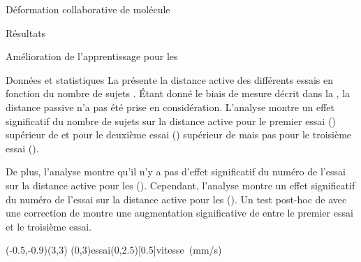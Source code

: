 \documentclass[myfrancais,ngerman,english,french]{mythesis}
\begin{document}
\begin{mychapter}{Déformation collaborative de molécule}
\begin{mysection}{Résultats}
\begin{mysubsection}{Amélioration de l'apprentissage pour les }
\begin{mysubsubsection}{Données et statistiques}
					La  présente la distance active  des différents essais  en fonction du nombre de sujets .
					Étant donné le biais de mesure décrit dans la , la distance passive n'a pas été prise en considération.
					L'analyse montre un effet significatif du nombre de sujets  sur la distance active  pour le premier essai () supérieur de  et pour le deuxième essai () supérieur de  mais pas pour le troisième essai ().

					De plus, l'analyse montre qu'il n'y a pas d'effet significatif du numéro de l'essai  sur la distance active  pour les  ().
					Cependant, l'analyse montre un effet significatif du numéro de l'essai  sur la distance active  pour les  ().
					Un test post-hoc de  avec une correction de  montre une augmentation significative de  entre le premier essai et le troisième essai.

					\begin{myfigure}
						\begin{myps}(-0.5,-0.9)(3,3)
							\myaxes(0,3){essai}(0,2.5)[0.5]{vitesse~(mm/s)}
						\end{myps}
					\end{myfigure}


\end{mysubsubsection}
\end{mysubsection}
\end{mysection}
\end{mychapter}
\end{document}
